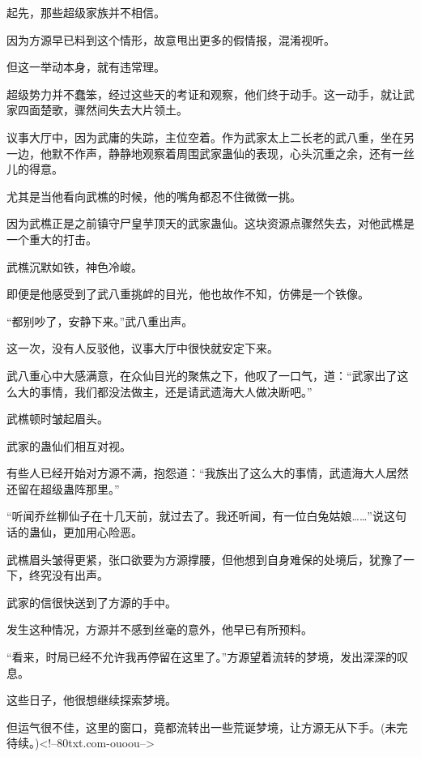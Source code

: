 \begin{this_body}
起先，那些超级家族并不相信。

因为方源早已料到这个情形，故意甩出更多的假情报，混淆视听。

但这一举动本身，就有违常理。

超级势力并不蠢笨，经过这些天的考证和观察，他们终于动手。这一动手，就让武家四面楚歌，骤然间失去大片领土。

议事大厅中，因为武庸的失踪，主位空着。作为武家太上二长老的武八重，坐在另一边，他默不作声，静静地观察着周围武家蛊仙的表现，心头沉重之余，还有一丝儿的得意。

尤其是当他看向武樵的时候，他的嘴角都忍不住微微一挑。

因为武樵正是之前镇守尸皇芋顶天的武家蛊仙。这块资源点骤然失去，对他武樵是一个重大的打击。

武樵沉默如铁，神色冷峻。

即便是他感受到了武八重挑衅的目光，他也故作不知，仿佛是一个铁像。

“都别吵了，安静下来。”武八重出声。

这一次，没有人反驳他，议事大厅中很快就安定下来。

武八重心中大感满意，在众仙目光的聚焦之下，他叹了一口气，道：“武家出了这么大的事情，我们都没法做主，还是请武遗海大人做决断吧。”

武樵顿时皱起眉头。

武家的蛊仙们相互对视。

有些人已经开始对方源不满，抱怨道：“我族出了这么大的事情，武遗海大人居然还留在超级蛊阵那里。”

“听闻乔丝柳仙子在十几天前，就过去了。我还听闻，有一位白兔姑娘……”说这句话的蛊仙，更加用心险恶。

武樵眉头皱得更紧，张口欲要为方源撑腰，但他想到自身难保的处境后，犹豫了一下，终究没有出声。

武家的信很快送到了方源的手中。

发生这种情况，方源并不感到丝毫的意外，他早已有所预料。

“看来，时局已经不允许我再停留在这里了。”方源望着流转的梦境，发出深深的叹息。

这些日子，他很想继续探索梦境。

但运气很不佳，这里的窗口，竟都流转出一些荒诞梦境，让方源无从下手。(未完待续。)<!--80txt.com-ouoou-->

\end{this_body}

